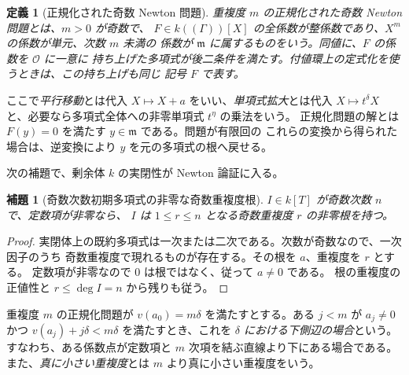 \documentclass[11pt,uplatex,dvipdfmx]{jsarticle}
\newcommand{\Val}{v}
\newcommand{\Ocal}{\mathcal O}
\theoremstyle{proofnote}
\newtheorem{lemma}[theorem]{補題}
\newtheorem{definition}[theorem]{定義}
\begin{document}
\begin{definition}[正規化された奇数 Newton 問題]
\label{def:odd-newton-problem}
  重複度 \(m\) の正規化された奇数 Newton 問題とは、\(m>0\) が奇数で、
  \(F\in k((\Gamma))[X]\) の全係数が整係数であり、\(X^m\) の係数が単元、次数 \(m\) 未満の
  係数が \(\mathfrak m\) に属するものをいう。同値に、\(F\) の係数を \(\Ocal\) に一意に
  持ち上げた多項式が後二条件を満たす。付値環上の定式化を使うときは、この持ち上げも同じ
  記号 \(F\) で表す。
\end{definition}

ここで\emph{平行移動}とは代入 \(X\mapsto X+a\) をいい、\emph{単項式拡大}とは代入
\(X\mapsto t^\delta X\) と、必要なら多項式全体への非零単項式 \(t^\eta\) の乗法をいう。
正規化問題の解とは \(F(y)=0\) を満たす \(y\in\mathfrak m\) である。問題が有限回の
これらの変換から得られた場合は、逆変換により \(y\) を元の多項式の根へ戻せる。

次の補題で、剰余体 \(k\) の実閉性が Newton 論証に入る。

\begin{lemma}[奇数次数初期多項式の非零な奇数重複度根]
\label{lem:proper-odd-root}
  \(I\in k[T]\) が奇数次数 \(n\) で、定数項が非零なら、
  \(I\) は \(1\le r\le n\) となる奇数重複度 \(r\) の非零根を持つ。
\end{lemma}
\begin{proof}
  実閉体上の既約多項式は一次または二次である。次数が奇数なので、一次因子のうち
  奇数重複度で現れるものが存在する。その根を \(a\)、重複度を \(r\) とする。
  定数項が非零なので \(0\) は根ではなく、従って \(a\ne0\) である。
  根の重複度の正値性と \(r\le\deg I=n\) から残りも従う。
\end{proof}

重複度 \(m\) の正規化問題が \(\Val(a_0)=m\delta\) を満たすとする。ある \(j<m\) が
\(a_j\ne0\) かつ \(\Val(a_j)+j\delta<m\delta\) を満たすとき、これを
\emph{\(\delta\) における下側辺の場合}という。すなわち、ある係数点が定数項と
\(m\) 次項を結ぶ直線より下にある場合である。また、\emph{真に小さい重複度}とは
\(m\) より真に小さい重複度をいう。
\end{document}
